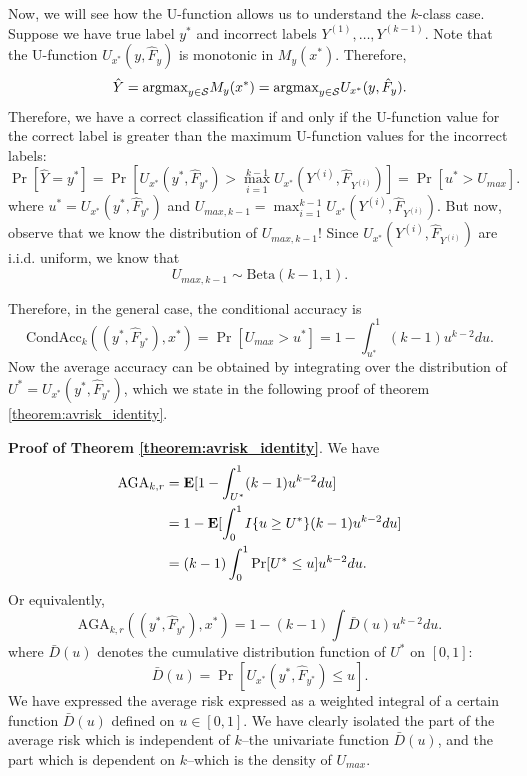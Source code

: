 Now, we will see how the U-function allows us to understand the
$k$-class case.  Suppose we have true label $y^*$ and incorrect labels
$Y^{(1)},\hdots, Y^{(k-1)}$.  Note that the U-function
$U_{x^*}(y, \hat{F}_y)$ is monotonic in $M_y(x^*)$.  Therefore,
\[
\hat{Y} = \text{argmax}_{y \in \mathcal{S}} M_y(x^*) = \text{argmax}_{y \in \mathcal{S}} U_{x^*}(y, \hat{F}_y).
\]
Therefore, we have a correct classification if and only if the U-function value for the correct label
is greater than the maximum U-function values for the incorrect labels:
\[
\Pr[\hat{Y} = y^*] = \Pr[U_{x^*}(y^*, \hat{F}_{y^*}) > \max_{i=1}^{k-1} U_{x^*}(Y^{(i)}, \hat{F}_{Y^{(i)}})] =  \Pr[u^* > U_{max}].
\]
where $u^* = U_{x^*}(y^*, \hat{F}_{y^*})$ and $U_{max, k-1}
= \max_{i=1}^{k-1} U_{x^*}(Y^{(i)}, \hat{F}_{Y^{(i)}})$.  But now,
observe that we know the distribution of $U_{max, k-1}$!  Since
$U_{x^*}(Y^{(i)}, \hat{F}_{Y^{(i)}})$ are i.i.d. uniform, we know that
\begin{equation}\label{eq:umax_beta}
U_{max, k-1} \sim \text{Beta}(k-1, 1). 
\end{equation}

Therefore, in the general case, the conditional accuracy is
\[
\text{CondAcc}_k((y^*, \hat{F}_{y^*}), x^*) = \Pr[U_{max} > u^*] = 1 - \int_{u^*}^1 (k-1) u^{k-2} du.
\]
Now the average accuracy can be obtained by integrating over the
distribution of $U^* = U_{x^*}(y^*, \hat{F}_{y^*})$, which we state in
the following proof of theorem \ref{theorem:avrisk_identity}.

\noindent\textbf{Proof of Theorem \ref{theorem:avrisk_identity}}.
We have
\begin{align*}
\text{AGA}_{k,r} &= \textbf{E}[ 1 - \int_{U^*}^1 (k-1) u^{k-2} du] 
\\&= 1 - \textbf{E}[\int_0^1 I\{u \geq U^*\} (k-1) u^{k-2} du ]
\\&= (k-1) \int_0^1 \Pr[U^* \leq u] u^{k-2} du.
\end{align*}
Or equivalently,
\[
\text{AGA}_{k, r}((y^*, \hat{F}_{y^*}), x^*) = 1 - (k-1) \int \bar{D}(u) u^{k-2} du.
\]
where $\bar{D}(u)$ denotes the cumulative distribution function of $U^*$ on $[0,1]$:
\begin{equation}\label{eq:Kbar}
\bar{D}(u) = \Pr[U_{x^*}(y^*, \hat{F}_{y^*}) \leq u].
\end{equation}
We have expressed the average risk expressed as a weighted integral of
a certain function $\bar{D}(u)$ defined on $u \in [0,1]$.  We have
clearly isolated the part of the average risk which is independent of
$k$--the univariate function $\bar{D}(u)$, and the part which is
dependent on $k$--which is the density of $U_{max}$.

